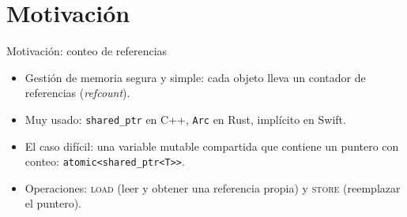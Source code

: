 \documentclass[aspectratio=169,11pt,xcolor=table]{beamer}
\begin{document}
\section{Motivación}
\begin{frame}{Motivación: conteo de referencias}
  \begin{itemize}
    \item Gestión de memoria segura y simple: cada objeto lleva un \alert{contador de referencias} (\emph{refcount}).
    \item Muy usado: \texttt{shared\_ptr} en C++, \texttt{Arc} en Rust, implícito en Swift.
    \item El caso difícil: una \alert{variable mutable compartida} que contiene un puntero con conteo:
      \texttt{atomic<shared\_ptr<T>{}>}.
    \item Operaciones: \textsc{load} (leer y obtener una referencia propia) y \textsc{store} (reemplazar el puntero).
  \end{itemize}
  \vspace{2mm}
\end{frame}
\end{document}
